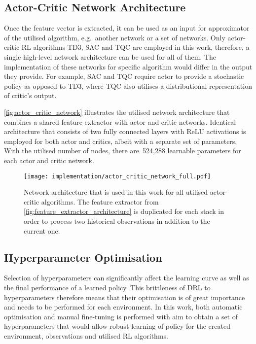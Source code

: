 \subsection{Actor-Critic Network Architecture}\label{subsec:actor_critic_network_architecture}

Once the feature vector is extracted, it can be used as an input for approximator of the utilised algorithm, e.g.~another network or a set of networks. Only actor-critic RL algorithms TD3, SAC and TQC are employed in this work, therefore, a single high-level network architecture can be used for all of them. The implementation of these networks for specific algorithm would differ in the output they provide. For example, SAC and TQC require actor to provide a stochastic policy as opposed to TD3, where TQC also utilises a distributional representation of critic's output.

\autoref{fig:actor_critic_network} illustrates the utilised network architecture that combines a shared feature extractor with actor and critic networks. Identical architecture that consists of two fully connected layers with ReLU activations is employed for both actor and critics, albeit with a separate set of parameters. With the utilised number of nodes, there are~524,288 learnable parameters for each actor and critic network.

\begin{figure}[ht]
    \centering
    \texttt{[image: implementation/actor\_critic\_network\_full.pdf]}
    \caption{Network architecture that is used in this work for all utilised actor-critic algorithms. The feature extractor from \protect\autoref{fig:feature_extractor_architecture} is duplicated for each stack in order to process two historical observations in addition to the current one.}
    \label{fig:actor_critic_network}
\end{figure}


\subsection{Hyperparameter Optimisation}

Selection of hyperparameters can significantly affect the learning curve as well as the final performance of a learned policy. This brittleness of DRL to hyperparameters therefore means that their optimisation is of great importance and needs to be performed for each environment. In this work, both automatic optimisation and manual fine-tuning is performed with aim to obtain a set of hyperparameters that would allow robust learning of policy for the created environment, observations and utilised RL algorithms.

